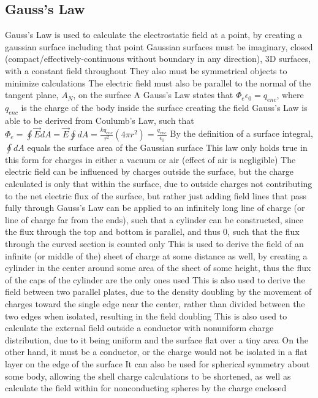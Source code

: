 \documentclass[11 pt, twoside]{article}
\newenvironment{outline*}
{
	\begin{outline}[enumerate]
	}
	{\end{outline}
}
\begin{document}
\subsection{Gauss's Law}
\begin{outline*}
\1 Gauss’s Law is used to calculate the electrostatic field at a point, by creating a gaussian surface including that point
\2 Gaussian surfaces must be imaginary, closed (compact/effectively-continuous without boundary in any direction), 3D surfaces, with a constant field throughout
\2 They also must be symmetrical objects to minimize calculations
\2 The electric field must also be parallel to the normal of the tangent plane, $A_N$, on the surface A
\1 Gauss's Law states that $\Phi_e \epsilon_0 = q_{enc}$, where $q_{enc}$ is the charge of the body inside the surface creating the field
\2 Gauss's Law is able to be derived from Coulumb's Law, such that $\Phi_e = \oint \vec{E} dA = \vec{E} \oint dA = \frac{kq_{enc}}{r^2} (4\pi r^2) = \frac{q_{enc}}{\epsilon_0}$
\2 By the definition of a surface integral, $\oint dA$ equals the surface area of the Gaussian surface
\2 This law only holds true in this form for charges in either a vacuum or air (effect of air is negligible)
\2 The electric field can be influenced by charges outside the surface, but the charge calculated is only that within the surface, due to outside charges not contributing to the net electric flux of the surface, but rather just adding field lines that pass fully through
\1 Gauss's Law can be applied to an infinitely long line of charge (or line of charge far from the ends), such that a cylinder can be constructed, since the flux through the top and bottom is parallel, and thus 0, such that the flux through the curved section is counted only
\2 This is used to derive the field of an infinite (or middle of the) sheet of charge at some distance as well, by creating a cylinder in the center around some area of the sheet of some height, thus the flux of the caps of the cylinder are the only ones used
\3 This is also used to derive the field between two parallel plates, due to the density doubling by the movement of charges toward the single edge near the center, rather than divided between the two edges when isolated, resulting in the field doubling
\3 This is also used to calculate the external field outside a conductor with nonuniform charge distribution, due to it being uniform and the surface flat over a tiny area
\4 On the other hand, it must be a conductor, or the charge would not be isolated in a flat layer on the edge of the surface
\2 It can also be used for spherical symmetry about some body, allowing the shell charge calculations to be shortened, as well as calculate the field within for nonconducting spheres by the charge enclosed

\end{outline*}
\end{document}
